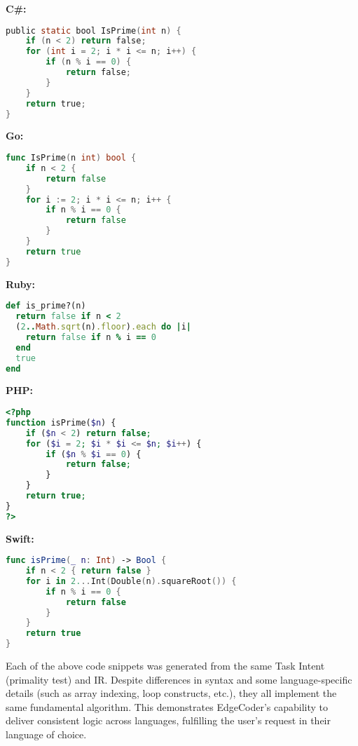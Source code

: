 \documentclass[12pt]{article}
\begin{document}
\noindent\textbf{C\#:}
{\singlespacing
\begin{lstlisting}[language=C]
public static bool IsPrime(int n) {
    if (n < 2) return false;
    for (int i = 2; i * i <= n; i++) {
        if (n % i == 0) {
            return false;
        }
    }
    return true;
}
\end{lstlisting}
}

\noindent\textbf{Go:}
{\singlespacing
\begin{lstlisting}[language=Go]
func IsPrime(n int) bool {
    if n < 2 {
        return false
    }
    for i := 2; i * i <= n; i++ {
        if n % i == 0 {
            return false
        }
    }
    return true
}
\end{lstlisting}
}

\noindent\textbf{Ruby:}
{\singlespacing
\begin{lstlisting}[language=Ruby]
def is_prime?(n)
  return false if n < 2
  (2..Math.sqrt(n).floor).each do |i|
    return false if n % i == 0
  end
  true
end
\end{lstlisting}
}

\noindent\textbf{PHP:}
{\singlespacing
\begin{lstlisting}[language=PHP]
<?php
function isPrime($n) {
    if ($n < 2) return false;
    for ($i = 2; $i * $i <= $n; $i++) {
        if ($n % $i == 0) {
            return false;
        }
    }
    return true;
}
?>
\end{lstlisting}
}

\noindent\textbf{Swift:}
{\singlespacing
\begin{lstlisting}[language=Swift]
func isPrime(_ n: Int) -> Bool {
    if n < 2 { return false }
    for i in 2...Int(Double(n).squareRoot()) {
        if n % i == 0 { 
            return false 
        }
    }
    return true
}
\end{lstlisting}
}

\noindent Each of the above code snippets was generated from the same Task Intent (primality test) and IR. Despite differences in syntax and some language-specific details (such as array indexing, loop constructs, etc.), they all implement the same fundamental algorithm. This demonstrates EdgeCoder’s capability to deliver consistent logic across languages, fulfilling the user's request in their language of choice.
\end{document}
